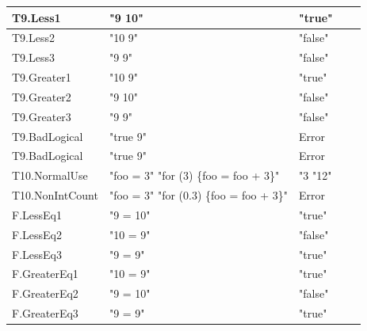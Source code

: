 \documentclass[a4paper, oneside, 11pt]{report}
\begin{document}
\begin{table}
\begin{tabular}{|p{1.5in}|p{1.5in}|p{1.6in}|p{1.6in}|p{2.4in}|}
\hline
T9.Less1                          & "9  10"                                 & "true"        &                \\ 
\hline
T9.Less2                          & "10  9"                                 & "false"       &                \\ 
\hline
T9.Less3                          & "9  9"                                  & "false"       &                \\ 
\hline
T9.Greater1                       & "10  9"                                 & "true"        &                \\ 
\hline
T9.Greater2                       & "9  10"                                 & "false"       &                \\ 
\hline
T9.Greater3                       & "9  9"                                  & "false"       &                \\ 
\hline
T9.BadLogical                     & "true  9"                               & Error         &                \\ 
\hline
T9.BadLogical\textbar{}\textbar{} & "true \textbar{}\textbar{} 9"           & Error         &                \\ 
\hline
T10.NormalUse                     & "foo = 3" "for (3) \{foo = foo + 3\}"   & "3 "12"       &                \\ 
\hline
T10.NonIntCount                   & "foo = 3" "for (0.3) \{foo = foo + 3\}" & Error         &                \\ 
\hline
F.LessEq1                         & "9 = 10"                                & "true"        &                \\ 
\hline
F.LessEq2                         & "10 = 9"                                & "false"       &                \\ 
\hline
F.LessEq3                         & "9 = 9"                                 & "true"        &                \\ 
\hline
F.GreaterEq1                      & "10 = 9"                                & "true"        &                \\ 
\hline
F.GreaterEq2                      & "9 = 10"                                & "false"       &                \\ 
\hline
F.GreaterEq3                      & "9 = 9"                                 & "true"        &                \\
\hline
\end{tabular}
\end{table}
\end{document}
